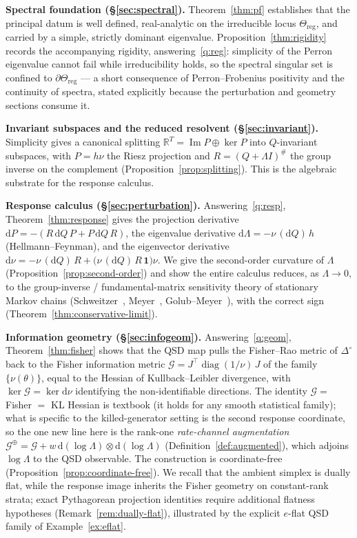 \documentclass[11pt,reqno]{amsart}
\theoremstyle{plain}
\theoremstyle{definition}
\theoremstyle{remark}
\newcommand{\R}{\mathbb{R}}
\newcommand{\Reg}{\Theta_{\mathrm{reg}}}
\newcommand{\Simp}{\Delta^{\!\circ}}
\newcommand{\one}{\mathbf{1}}
\newcommand{\dd}{\mathrm{d}}
\DeclareMathOperator{\Imm}{Im}
\DeclareMathOperator{\diag}{diag}
\begin{document}
\smallskip
\noindent\textbf{Spectral foundation (\S\ref{sec:spectral}).}
Theorem~\ref{thm:pf} establishes that the principal datum is well defined,
real-analytic on the irreducible locus $\Reg$, and carried by a simple, strictly
dominant eigenvalue. Proposition~\ref{thm:rigidity} records the accompanying
rigidity, answering~\ref{q:reg}: simplicity of the Perron eigenvalue cannot fail
while irreducibility holds, so the spectral singular set is confined to
$\partial\Reg$ --- a short consequence of Perron--Frobenius positivity and the
continuity of spectra, stated explicitly because the perturbation and geometry
sections consume it.

\smallskip
\noindent\textbf{Invariant subspaces and the reduced resolvent (\S\ref{sec:invariant}).}
Simplicity gives a canonical splitting $\R^{T}=\Imm P\oplus\ker P$ into
$Q$-invariant subspaces, with $P=h\nu$ the Riesz projection and
$R=(Q+\Lambda I)^{\#}$ the group inverse on the complement
(Proposition~\ref{prop:splitting}). This is the algebraic substrate for the
response calculus.

\smallskip
\noindent\textbf{Response calculus (\S\ref{sec:perturbation}).}
Answering~\ref{q:resp}, Theorem~\ref{thm:response} gives the projection
derivative $\dd P=-(R\,\dd Q\,P+P\,\dd Q\,R)$, the eigenvalue derivative
$\dd\Lambda=-\nu\,(\dd Q)\,h$ (Hellmann--Feynman), and the eigenvector derivative
$\dd\nu=-\nu\,(\dd Q)\,R+\bigl(\nu\,(\dd Q)\,R\,\one\bigr)\nu$. We give the
second-order curvature of $\Lambda$ (Proposition~\ref{prop:second-order}) and show
the entire calculus reduces, as $\Lambda\to 0$, to the group-inverse / fundamental-matrix
sensitivity theory of stationary Markov chains
(Schweitzer~\cite{Schweitzer1968}, Meyer~\cite{Meyer1975}, Golub--Meyer~\cite{GolubMeyer1986}),
with the correct sign (Theorem~\ref{thm:conservative-limit}).

\smallskip
\noindent\textbf{Information geometry (\S\ref{sec:infogeom}).}
Answering~\ref{q:geom}, Theorem~\ref{thm:fisher} shows that the QSD map pulls the
Fisher--Rao metric of $\Simp$ back to the Fisher information metric
$\mathcal G=J^{\top}\diag(1/\nu)\,J$ of the family $\{\nu(\theta)\}$, equal to the
Hessian of Kullback--Leibler divergence, with $\ker\mathcal G=\ker\dd\nu$
identifying the non-identifiable directions. The identity $\mathcal G=$ Fisher $=$
KL Hessian is textbook (it holds for any smooth statistical family); what is specific
to the killed-generator setting is the second response coordinate, so the one new
line here is the rank-one \emph{rate-channel augmentation}
$\mathcal G^{\oplus}=\mathcal G+w\,\dd(\log\Lambda)\otimes
\dd(\log\Lambda)$ (Definition~\ref{def:augmented}), which adjoins $\log\Lambda$ to
the QSD observable. The construction is coordinate-free
(Proposition~\ref{prop:coordinate-free}). We recall that the ambient
simplex is dually flat, while the response image inherits the Fisher geometry on
constant-rank strata; exact Pythagorean projection identities require additional
flatness hypotheses (Remark~\ref{rem:dually-flat}), illustrated by the explicit
$e$-flat QSD family of Example~\ref{ex:eflat}.
\end{document}
